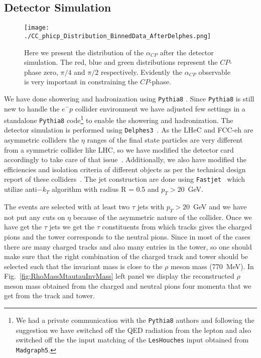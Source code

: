 \documentclass[pdftex,twocolumn,epjc3]{svjour3}          %
\begin{document}
\subsection{Detector Simulation}
\label{DetectorSimulation}

\begin{figure}[t]
\texttt{[image: ./CC\_phicp\_Distribution\_BinnedData\_AfterDelphes.png]}
\caption{  {\small Here we present the distribution of the $\alpha_{CP}$ after the detector simulation. The red, blue and green distributions represent the $CP$-phase zero, $\pi/4$ and $\pi/2$ respectively. Evidently the $\alpha_{CP}$ observable is very important in constraining the $CP$-phase.}}
	\label{fig:alphaCPAfterDelphes}
\end{figure}
%

We have done showering and hadronization using \texttt{Pythia8} \cite{Sjostrand:2006za}. Since \texttt{Pythia8} is still new to handle the $e^- p$ collider environment we have adjusted few settings in a standalone \texttt{Pythia8} code\footnote{We had a private communication with the \texttt{Pythia8} authors and following the suggestion we have switched off the QED radiation from the lepton and also switched off the the input matching of the \texttt{LesHouches} input obtained from \texttt{Madgraph5}.} to enable the showering and hadronization. The detector simulation is performed using \texttt{Delphes3}~\cite{deFavereau:2013fsa}. As the LHeC and FCC-eh are asymmetric colliders the $\eta$ ranges of the final state particles are very different from a symmetric collider like LHC, so we have modified the detector card accordingly to take care of that issue~\cite{Kumar:2015kca}. Additionally, we also have modified the efficiencies and isolation criteria of different objects as per the technical design report of these colliders~\cite{AbelleiraFernandez:2012cc}. The jet construction are done using \texttt{Fastjet}~\cite{Cacciari:2011ma} which utilize anti$-k_T$ algorithm with radius R = 0.5 and $p_T > 20$~GeV.

The events are selected with at least two $\tau$ jets with $p_T > 20$~GeV and we have not put any cuts on $\eta$ because of the asymmetric nature of the collider. Once we have get the $\tau$ jets we get the $\tau$ constituents from which tracks gives the charged pions and the tower corresponds to the neutral pions. Since in most of the cases there are many charged tracks and also many entries in the tower, so one should make sure that the right combination of the charged track and tower should be selected such that the invariant mass is close to the $\rho$ meson mass (770~MeV). In Fig.~\ref{fig:RhoMassMtautauInvMass} left panel we display the reconstructed $\rho$ meson mass obtained from the charged and neutral pions four momenta that we get from the track and tower. %
\end{document}
